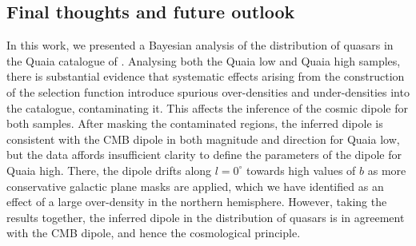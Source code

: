 \documentclass[fleqn,usenatbib]{mnras}
\begin{document}
    \subsection{Final thoughts and future outlook}
        In this work, we presented a Bayesian analysis of the distribution of quasars in the Quaia catalogue of \citet{storeyfisher2023quaia}.
        Analysing both the Quaia low and Quaia high samples, there is substantial evidence that systematic effects arising from the construction of the selection function introduce spurious over-densities and under-densities into the catalogue, contaminating it.
        This affects the inference of the cosmic dipole for both samples.
        After masking the contaminated regions, the inferred dipole is consistent with the CMB dipole in both magnitude and direction for Quaia low, but the data affords insufficient clarity to define the parameters of the dipole for Quaia high.
        There, the dipole drifts along $l = 0^\circ$ towards high values of $b$ as more conservative galactic plane masks are applied, which we have identified as an effect of a large over-density in the northern hemisphere.
        However, taking the results together, the inferred dipole in the distribution of quasars is in agreement with the CMB dipole, and hence the cosmological principle.
\end{document}

